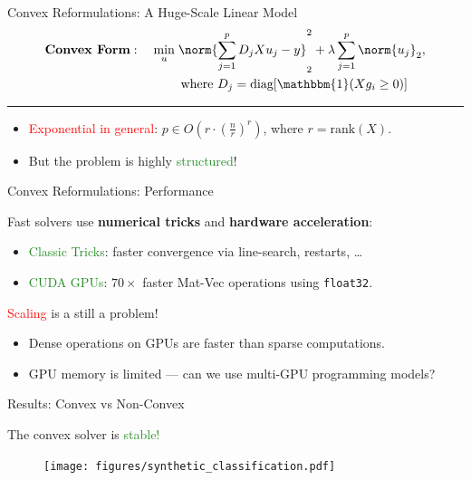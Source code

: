 \documentclass[usenames,dvipsnames,mathserif,notheorems]{beamer}
\begin{document}
\begin{frame}{Convex Reformulations: A Huge-Scale Linear Model}
	\vspace{-2em}
	\[
		\begin{aligned}
			\textbf{Convex Form}: \quad
			\min_{u} \; & \norm{\sum_{j=1}^p D_j X u_j - y}_2^2 +
			\lambda \sum_{j=1}^p \norm{u_j}_2,                    \\
			            & \hspace{0.2em} \text{where }
			D_j = \text{diag}[\mathbbm{1}(X g_i \geq 0)]
		\end{aligned}
	\]
	{
	\vspace{-0.5em}
	\center \rule{\textwidth}{0.1em}
	\vspace{-0.2em}
	}

	\begin{itemize}
		\Large
		\item \textcolor{red}{Exponential in general}: \( p \in O(r \cdot (\frac{n}{r})^r) \),
		      where \( r = \text{rank}(X) \).
		      \vspace{1em}

		\item But the problem is highly \textcolor{ForestGreen}{structured}!
	\end{itemize}

\end{frame}

\begin{frame}{Convex Reformulations: Performance}

	{\large Fast solvers use \textbf{numerical tricks} and \textbf{hardware acceleration}:}
	\vspace{1em}
	\begin{itemize}
		\item \textcolor{ForestGreen}{Classic Tricks}: faster convergence via line-search, restarts, \ldots
		\item \textcolor{ForestGreen}{CUDA GPUs}: \( 70\times \) faster Mat-Vec operations using \texttt{float32}.
	\end{itemize}
	\vspace{1em}

	\textcolor{red}{Scaling} is a still a problem!
	\begin{itemize}
		\item Dense operations on GPUs are faster than sparse computations.
		\item GPU memory is limited --- can we use multi-GPU programming models?
	\end{itemize}

\end{frame}
\begin{frame}{Results: Convex vs Non-Convex}

	\begin{center}
		{\Large The convex solver is \textcolor{ForestGreen}{stable!}}
	\end{center}

	\begin{figure}[]
		\centering
		\texttt{[image: figures/synthetic\_classification.pdf]}
	\end{figure}
\end{frame}
\end{document}
